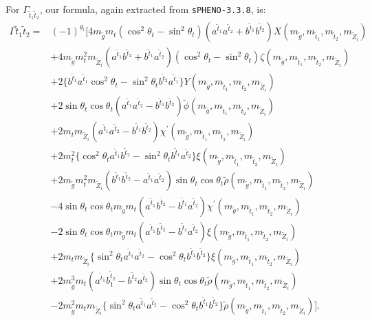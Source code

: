 \documentclass[final,3p,times]{elsarticle}
\begin{document}
For $\Gamma_{\tilde{t}_1 \tilde{t}_2}$, our formula, again extracted from {\tt sPHENO-3.3.8}, is:
\begin{equation}
\begin{aligned}
\Gamma{\tilde{t}_{1} \tilde{t}_2} = & (-1)^{\theta_i}\Big[4m_{\tilde{g}}m_{t}(\cos^2 \theta_t - \sin^2 \theta_t)(a^{\tilde{t}_1} a^{\tilde{t}_2} + b^{\tilde{t}_1} b^{\tilde{t}_2})X(m_{\tilde{g}},m_{\tilde{t}_1}, m_{\tilde{t}_2}, m_{\tilde{Z}_i}) \\ & + 4m_{\tilde{g}}m_{t}^2 m_{\tilde{Z}_i}(a^{\tilde{t}_1} b^{\tilde{t}_2} + b^{\tilde{t}_1}a^{\tilde{t}_2})(\cos^2 \theta_t - \sin^2 \theta_t)\zeta (m_{\tilde{g}},m_{\tilde{t}_1}, m_{\tilde{t}_2}, m_{\tilde{Z}_i}) \\ & + 2 \{b^{\tilde{t}_1}a^{\tilde{t}_1}\cos^2 \theta_t - \sin^2 \theta_t b^{\tilde{t}_2}a^{\tilde{t}_1} \}Y (m_{\tilde{g}},m_{\tilde{t}_1}, m_{\tilde{t}_2}, m_{\tilde{Z}_i}) \\ & + 2\sin\theta_t \cos\theta_t (a^{\tilde{t}_1} a^{\tilde{t}_2} - b^{\tilde{t}_1}b^{\tilde{t}_2}) \tilde{\phi} (m_{\tilde{g}},m_{\tilde{t}_1}, m_{\tilde{t}_2}, m_{\tilde{Z}_i}) \\ & + 2m_{t}m_{\tilde{Z}_i}(a^{\tilde{t}_1}a^{\tilde{t}_2} - b^{\tilde{t}_1}b^{\tilde{t}_2})\chi^{'} (m_{\tilde{g}},m_{\tilde{t}_1}, m_{\tilde{t}_2}, m_{\tilde{Z}_i}) \\ & + 2 m_{t}^2 \{\cos^2 \theta_t a^{\tilde{t}_1} b^{\tilde{t}_2} - \sin^2 \theta_t b^{\tilde{t}_1}a^{\tilde{t}_2}\}\xi (m_{\tilde{g}},m_{\tilde{t}_1}, m_{\tilde{t}_2}, m_{\tilde{Z}_i}) \\ & + 2m_{\tilde{g}}m_{t}^2 m_{\tilde{Z}_{i}}(b^{\tilde{t}_1} b^{\tilde{t}_2}-a^{\tilde{t}_1} a^{\tilde{t}_2})\sin\theta_t \cos\theta_t \tilde{\rho} (m_{\tilde{g}},m_{\tilde{t}_1}, m_{\tilde{t}_2}, m_{\tilde{Z}_i}) \\ & - 4\sin\theta_t \cos\theta_t m_{\tilde{g}}m_{t}(a^{\tilde{t}_1}b^{\tilde{t}_2}-b^{\tilde{t}_1}a^{\tilde{t}_2})\chi^{'} (m_{\tilde{g}},m_{\tilde{t}_1}, m_{\tilde{t}_2}, m_{\tilde{Z}_i}) \\ & - 2\sin\theta_t \cos\theta_t m_{\tilde{g}}m_{t}(a^{\tilde{t}_1} b^{\tilde{t}_2} - b^{\tilde{t}_1} a^{\tilde{t}_2}) \xi (m_{\tilde{g}},m_{\tilde{t}_1}, m_{\tilde{t}_2}, m_{\tilde{Z}_i}) \\ & + 2m_{t} m_{\tilde{Z}_i}\{\sin^2 \theta_t a^{\tilde{t}_1} a^{\tilde{t}_2} - \cos^2 \theta_t b^{\tilde{t}_1} b^{\tilde{t}_2}\} \xi (m_{\tilde{g}},m_{\tilde{t}_1}, m_{\tilde{t}_2}, m_{\tilde{Z}_i}) \\ & + 2 m_{\tilde{g}}^3 m_{t}(a^{\tilde{t}_1} b_{1}^{\tilde{t}_2} - b^{\tilde{t}_2} a^{\tilde{t}_2})\sin\theta_{t} \cos\theta_t \tilde{\rho} (m_{\tilde{g}},m_{\tilde{t}_1}, m_{\tilde{t}_2}, m_{\tilde{Z}_i}) \\ & - 2 m_{\tilde{g}}^2 m_{t} m_{\tilde{Z}_{i}}\{\sin^2 \theta_t a^{\tilde{t}_1} a^{\tilde{t}_2} - \cos^2 \theta_t b^{\tilde{t}_1}b^{\tilde{t}_2}\} \tilde{\rho} (m_{\tilde{g}},m_{\tilde{t}_1}, m_{\tilde{t}_2}, m_{\tilde{Z}_i})\Big].
\end{aligned}
\end{equation}
\end{document}

